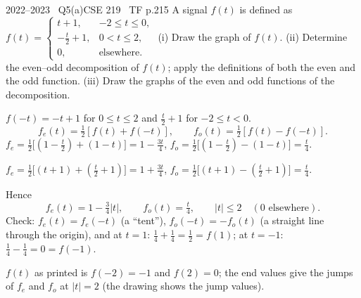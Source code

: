 \begin{qcard}{2022--2023 \textbullet\ Q5(a)}{CSE 219 \textbullet\ TF p.2}{15}
A signal $f(t)$ is defined as $f(t)=\begin{cases}t+1,&-2\le t\le0,\\-\frac t2+1,&0<t\le2,\\0,&\text{elsewhere.}\end{cases}$
(i) Draw the graph of $f(t)$. (ii) Determine the even--odd decomposition of $f(t)$; apply the definitions of both the even and the odd function. (iii) Draw the graphs of the even and odd functions of the decomposition.
\end{qcard}
\begin{solution}
$f(-t)=-t+1$ for $0\le t\le2$ and $\frac t2+1$ for $-2\le t<0$.
\[
f_e(t)=\tfrac12[f(t)+f(-t)],\qquad f_o(t)=\tfrac12[f(t)-f(-t)].
\]
 $f_e=\tfrac12\big[(1-\tfrac t2)+(1-t)\big]=1-\tfrac{3t}{4}$, \quad $f_o=\tfrac12\big[(1-\tfrac t2)-(1-t)\big]=\tfrac t4$.

 $f_e=\tfrac12\big[(t+1)+(\tfrac t2+1)\big]=1+\tfrac{3t}{4}$, \quad $f_o=\tfrac12\big[(t+1)-(\tfrac t2+1)\big]=\tfrac t4$.

Hence
\[
f_e(t)=1-\tfrac34|t|,\qquad f_o(t)=\tfrac t4,\qquad |t|\le2\quad(0\text{ elsewhere}).
\]
Check: $f_e(t)=f_e(-t)$ (a ``tent''), $f_o(-t)=-f_o(t)$ (a straight line through the origin), and at $t=1$: $\frac14+\frac14=\frac12=f(1)$; at $t=-1$: $\frac14-\frac14=0=f(-1)$.
\begin{center}
\hspace{1mm}
\hspace{1mm}
\end{center}
\begin{notebox}$f(t)$ as printed is $f(-2)=-1$ and $f(2)=0$; the end values give the jumps of $f_e$ and $f_o$ at $|t|=2$ (the drawing shows the jump values).\end{notebox}
\end{solution}


